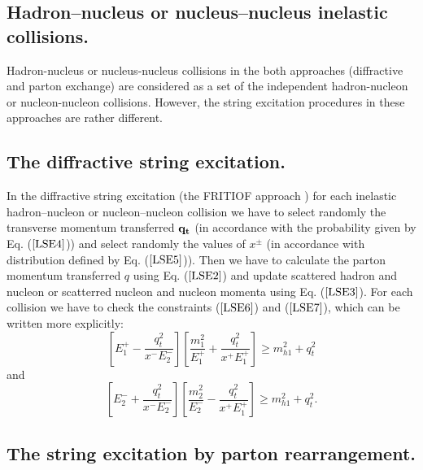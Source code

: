 \subsection{Hadron--nucleus or nucleus--nucleus inelastic collisions.}

\hspace{1.0em}Hadron-nucleus or nucleus-nucleus collisions in the both
approaches (diffractive and parton exchange) are considered 
as a set of the independent hadron-nucleon or
nucleon-nucleon collisions.  However, the string excitation procedures
in these approaches are rather different.

\subsection{The diffractive string excitation.} 

\hspace{1.0em}In the diffractive string excitation (the 
FRITIOF approach \cite{FRITIOF87}) for each
inelastic hadron--nucleon or nucleon--nucleon collision we have to select
randomly the transverse momentum transferred ${\bf q_t}$ (in accordance
with the probability given by Eq. ($\ref{LSE4}$)) and select randomly
the values of $x^{\pm}$ (in accordance with distribution defined by
Eq. ($\ref{LSE5}$)). Then we have to calculate the parton momentum
transferred $q$ using Eq. ($\ref{LSE2}$) and update scattered hadron
and nucleon or scatterred nucleon and nucleon momenta using
Eq. ($\ref{LSE3}$). For each collision we have to check the constraints
($\ref{LSE6}$) and ($\ref{LSE7}$), which can be written more
explicitly:
\begin{equation}
\label{LSE8} [E_1^{+} -\frac{q^2_t}{x^{-}E^{-}_2}][\frac{m_1^2}{E^{+}_1} + 
\frac{q^2_t}{x^{+}E^{+}_1}]\geq m^2_{h1} + q^2_t
\end{equation}
and
\begin{equation}
\label{LSE9} [E_2^{-} +\frac{q^2_t}{x^{-}E^{-}_2}][\frac{m_2^2}{E^{-}_2} - 
\frac{q^2_t}{x^{+}E^{+}_1}]\geq m^2_{h1} + q^2_t.
\end{equation}

\subsection{The string excitation by parton rearrangement.} 

